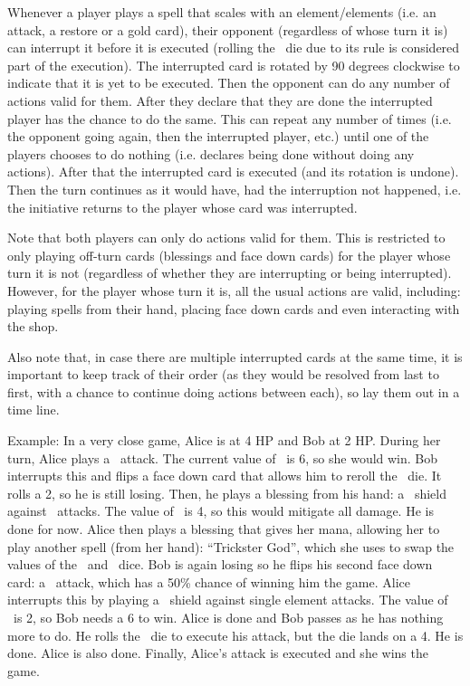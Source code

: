 \documentclass[dvipsnames,parskip,a4paper]{scrartcl}
\newcommand{\iconsize}{3.4mm}
\newcommand{\icondepth}{0.45mm}
\newcommand{\icon}[1]{\raisebox{-\icondepth}{\texttt{[image:  \#1 ]}}}
\newcommand{\chance}{\icon{icons/chance.png}}
\newcommand{\fire}{\icon{icons/fire.png}}
\newcommand{\water}{\icon{icons/water.png}}
\newcommand{\gold}{\icon{icons/gold.png}}
\begin{document}
Whenever a player plays a spell that scales with an element/elements (i.e. an attack, a restore or a gold card), their opponent (regardless of whose turn it is) can interrupt it before it is executed (rolling the \chance \ die due to its rule is considered part of the execution). The interrupted card is rotated by 90 degrees clockwise to indicate that it is yet to be executed. Then the opponent can do any number of actions valid for them. After they declare that they are done the interrupted player has the chance to do the same. This can repeat any number of times (i.e. the opponent going again, then the interrupted player, etc.) until one of the players chooses to do nothing (i.e. declares being done without doing any actions). After that the interrupted card is executed (and its rotation is undone). Then the turn continues as it would have, had the interruption not happened, i.e. the initiative returns to the player whose card was interrupted.

\vspace{4pt}

Note that both players can only do actions valid for them. This is restricted to only playing off-turn cards (blessings and face down cards) for the player whose turn it is not (regardless of whether they are interrupting or being interrupted). However, for the player whose turn it is, all the usual actions are valid, including: playing spells from their hand, placing face down cards and even interacting with the shop.

\vspace{4pt}

Also note that, in case there are multiple interrupted cards at the same time, it is important to keep track of their order (as they would be resolved from last to first, with a chance to continue doing actions between each), so lay them out in a time line.

\vspace{4pt}

Example: In a very close game, Alice is at 4 HP and Bob at 2 HP. During her turn, Alice plays a \fire \ attack. The current value of \fire \ is 6, so she would win. Bob interrupts this and flips a face down card that allows him to reroll the \fire \ die. It rolls a 2, so he is still losing. Then, he plays a blessing from his hand: a \water \ shield against \fire \ attacks. The value of \water \ is 4, so this would mitigate all damage. He is done for now. Alice then plays a blessing that gives her mana, allowing her to play another spell (from her hand): ``Trickster God'', which she uses to swap the values of the \fire \ and \water \ dice. Bob is again losing so he flips his second face down card: a \chance \ attack, which has a 50\% chance of winning him the game. Alice interrupts this by playing a \gold \ shield against single element attacks. The value of \gold \ is 2, so Bob needs a 6 to win. Alice is done and Bob passes as he has nothing more to do. He rolls the \chace \ die to execute his attack, but the die lands on a 4. He is done. Alice is also done. Finally, Alice's attack is executed and she wins the game.
\end{document}
